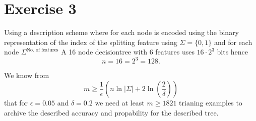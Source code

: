 \section*{Exercise 3}
Using a description scheme where for each node is encoded using the binary representation of the index of the splitting feature using $\Sigma = \lbrace0,1\rbrace$ and for each node $\Sigma^{\text{No. of features}}$
A 16 node decisiontree with 6 features uses $16\cdot 2^3$ bits hence \[n=16=2^3=128.\]

We know from \[m \ge \frac{1}{\epsilon}\left(n \ln |\Sigma| + 2\ln\left(\frac{2}{\delta}\right)\right)\] that for $\epsilon = 0.05$ and $\delta = 0.2$ we need at least $m\ge1821$ trianing examples to archive the described accuracy and propability for the described tree.